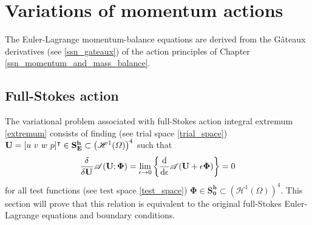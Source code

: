 
\chapter{Variations of momentum actions}

The Euler-Lagrange momentum-balance equations are derived from the G\^{a}teaux derivatives (see \cref{ssn_gateaux}) of the action principles of Chapter \cref{ssn_momentum_and_mass_balance}.

\section{Full-Stokes action}

The variational problem associated with full-Stokes action integral extremum \cref{extremum} consists of finding (see trial space \cref{trial_space}) $\mathbf{U} = [u\ v\ w\ p]^\intercal \in \mathbf{S_E^h} \subset \left( \mathscr{H}^1(\varOmega) \right)^4$ such that
\begin{align}
  \label{full_stokes_var_form_2}
  \frac{\delta{^{}} }{\delta \mathbf{U}{^{}} } \mathscr{A}(\mathbf{U}; \bm{\Phi}) = \lim_{\epsilon \rightarrow 0} \left\{ \frac{\mathrm{d}{^{}} }{\mathrm{d} \epsilon{^{}} } \mathscr{A}(\mathbf{U} + \epsilon \bm{\Phi}) \right\} = 0 
\end{align}
for all test functions (see test space \cref{test_space}) $\bm{\Phi} \in \mathbf{S_0^h} \subset \left( \mathscr{H}^1(\Omega) \right)^4$.
This section will prove that this relation is equivalent to the original full-Stokes Euler-Lagrange equations and boundary conditions.

